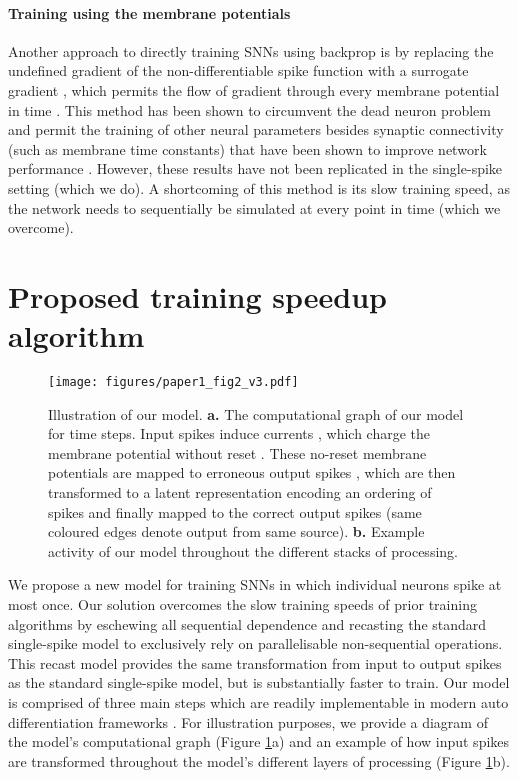 \documentclass{article} \usepackage{iclr2023_conference,times}
\begin{document}
\paragraph{Training using the membrane potentials} Another approach to directly training SNNs using backprop is by replacing the undefined gradient of the non-differentiable spike function with a surrogate gradient \citep{esser2016convolutional, hunsberger2015spiking, zenke2018superspike, lee2016training}, which permits the flow of gradient through every membrane potential in time \citep{bellec2018long, shrestha2018slayer, neftci2019surrogate}. This method has been shown to circumvent the dead neuron problem and permit the training of other neural parameters besides synaptic connectivity (such as membrane time constants) that have been shown to improve network performance \citep{perez2021neural}. However, these results have not been replicated in the single-spike setting (which we do). A shortcoming of this method is its slow training speed, as the network needs to sequentially be simulated at every point in time (which we overcome).

\section{Proposed training speedup algorithm}
\label{sec:our_model}
\begin{figure}[h!]
    \texttt{[image: figures/paper1\_fig2\_v3.pdf]}
	\centering
	\caption{Illustration of our model. \textbf{a.} The computational graph of our model for  time steps. Input spikes  induce currents , which charge the membrane potential without reset . These no-reset membrane potentials are mapped to erroneous output spikes , which are then transformed to a latent representation  encoding an ordering of spikes and finally mapped to the correct output spikes  (same coloured edges denote output from same source). \textbf{b.} Example activity of our model throughout the different stacks of processing.}
	\label{fig:model}
\end{figure}

We propose a new model for training SNNs in which individual neurons spike at most once. Our solution overcomes the slow training speeds of prior training algorithms by eschewing all sequential dependence and recasting the standard single-spike model to exclusively rely on parallelisable non-sequential operations. This recast model provides the same transformation from input to output spikes as the standard single-spike model, but is substantially faster to train. Our model is comprised of three main steps which are readily implementable in modern auto differentiation frameworks \citep{abadi2016tensorflow, paszke2017automatic, jax2018github}. For illustration purposes, we provide a diagram of the model's computational graph (Figure \ref{fig:model}a) and an example of how input spikes are transformed throughout the model's different layers of processing (Figure \ref{fig:model}b).
\end{document}
